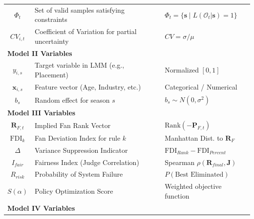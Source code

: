 \begin{table}[ht]
\begin{tabular}{cll}
        $\Phi_t$             & Set of valid samples satisfying constraints        & $\Phi_t = \{\mathbf{s} \mid L(\mathcal{O}_t|\mathbf{s})=1\}$ \\
        $CV_{i,t}$           & Coefficient of Variation for partial uncertainty   & $CV = \sigma / \mu$                                          \\
        \midrule
        \multicolumn{3}{l}{\textbf{Model II Variables}}                                                                                          \\
        $y_{i,s}$            & Target variable in LMM (e.g., Placement)           & Normalized $[0,1]$                                           \\
        $\mathbf{x}_{i,s}$   & Feature vector (Age, Industry, etc.)               & Categorical / Numerical                                      \\
        $b_s$                & Random effect for season $s$                       & $b_s \sim N(0, \sigma^2)$                                    \\
        \midrule
        \multicolumn{3}{l}{\textbf{Model III Variables}}                                                                                         \\
        $\mathbf{R}_{F,t}$   & Implied Fan Rank Vector                            & $\text{Rank}(-\mathbf{P}_{F,t})$                             \\
        $\text{FDI}_k$       & Fan Deviation Index for rule $k$                   & Manhattan Dist. to $\mathbf{R}_{F}$                          \\
        $\Delta$             & Variance Suppression Indicator                     & $\text{FDI}_{Rank} - \text{FDI}_{Percent}$                   \\
        $I_{fair}$           & Fairness Index (Judge Correlation)                 & Spearman $\rho(\mathbf{R}_{final}, \mathbf{J})$              \\
        $R_{risk}$           & Probability of System Failure                      & $P(\text{Best Eliminated})$                                  \\
        $S(\alpha)$          & Policy Optimization Score                          & Weighted objective function                                  \\
        \midrule
        \multicolumn{3}{l}{\textbf{Model IV Variables}}                                                                                          \\

\end{tabular}
\end{table}
